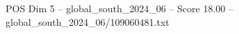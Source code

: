 \begin{textsample}{POS Dim 5 – global\_south\_2024\_06 – Score 18.00 – global\_south\_2024\_06/109060481.txt}
\end{textsample}

